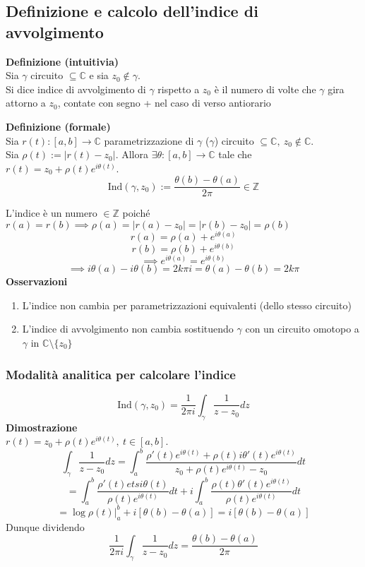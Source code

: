 \documentclass[a4paper]{article}
\newcommand{\C}{\mathbb{C}}
\newcommand{\Z}{\mathbb{Z}}
\begin{document}
\subsection{Definizione e calcolo dell'indice di avvolgimento}
\begin{tcolorbox}
	\textbf{Definizione (intuitivia)}
	\\Sia $\gamma$ circuito $\subseteq \C$ e sia $z_0 \not\in \gamma$.
	\\Si dice indice di avvolgimento di $\gamma$ rispetto a $z_0$ è il numero di volte che $\gamma$ gira attorno a $z_0$, contate con segno + nel caso di verso antiorario
\end{tcolorbox}
\begin{tcolorbox}
	\textbf{Definizione (formale)} \\
	Sia $r(t):[a,b]\to \C$ parametrizzazione di $\gamma$ ($\gamma$) circuito $\subseteq \C,\ z_0 \not\in \C $.
	\\Sia $\rho (t):=|r(t)-z_0|$. Allora $\exists \theta:[a,b]\to \C$ tale che $r(t)=z_0+\rho(t)e^{i\theta(t)}$.
	\[\text{Ind}(\gamma,z_0):= \frac{\theta(b)-\theta(a)}{2\pi}\in\Z\]
\end{tcolorbox}
L'indice è un numero $\in\Z$ poiché $r(a)=r(b)\implies\rho(a)=|r(a)-z_0|=|r(b)-z_0|=\rho(b)$
\[r(a)=\rho (a)+e^{i\theta(a)}\]
\[r(b)=\rho(b)+e^{i\theta(b)}\]
\[\implies e^{i\theta(a)}=e^{i\theta(b)}\]
\[\implies i\theta(a)-i\theta(b)=2k\pi i = \theta(a)-\theta(b)=2k \pi\]
\textbf{Osservazioni}
\begin{enumerate}
	\item L'indice non cambia per parametrizzazioni equivalenti (dello stesso circuito)
	\item L'indice di avvolgimento non cambia sostituendo $\gamma$ con un circuito omotopo a $\gamma$ in $\C\setminus \{z_0\} $
\end{enumerate}
\subsubsection{Modalità analitica per calcolare l'indice}
\[\text{Ind}(\gamma, z_0)=\frac{1}{2\pi i} \int_{\gamma}^{} \frac{1}{z-z_0}dz\]
\textbf{Dimostrazione} 
\\$r(t)=z_0+\rho(t)e^{i\theta(t)},\ t\in[a,b]$.
\[\int_{\gamma}^{} \frac{1}{z-z_0}dz=\int_{a}^{b} \frac{\rho'(t)e^{i\theta(t)}+\rho(t)i\theta'(t)e^{i\theta(t)}}{z_0+\rho(t)e^{i\theta(t)}-z_0}dt\]
\[=\int_{a}^{b} \frac{\rho'(t)etsi\theta(t)}{\rho(t)e^{i\theta(t)}}dt+i \int_{a}^{ b} \frac{\rho(t)\theta'(t)e^{i\theta(t)}}{\rho(t) e^{i\theta(t)}}dt\]
\[=\log\rho(t)|_a^b+i[\theta(b)-\theta(a)]=i[\theta(b)-\theta(a)]\]
Dunque dividendo
\[\frac{1}{2\pi i}\int_{\gamma}^{} \frac{1}{z-z_0}dz=\frac{\theta(b)-\theta(a)}{2\pi}\]
\end{document}
